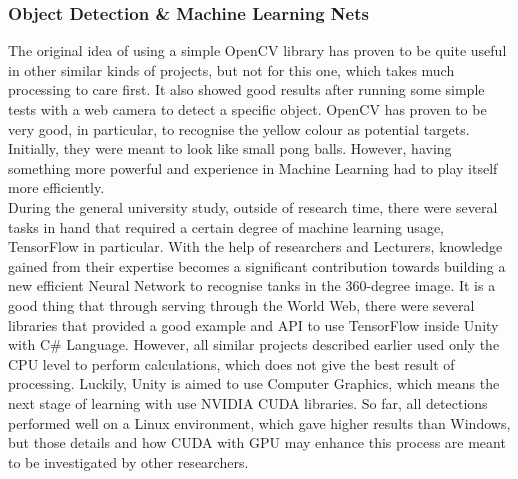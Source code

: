 \subsubsection{Object Detection \& Machine Learning Nets}
The original idea of using a simple OpenCV library has proven to be quite useful in other similar kinds of projects, but not for this one, which takes much processing to care first.
It also showed good results after running some simple tests with a web camera to detect a specific object.
OpenCV has proven to be very good, in particular, to recognise the yellow colour as potential targets.
Initially, they were meant to look like small pong balls.
However, having something more powerful and experience in Machine Learning had to play itself more efficiently. \\[1pc]
During the general university study, outside of research time, there were several tasks in hand that required a certain degree of machine learning usage, TensorFlow in particular.
With the help of researchers and Lecturers, knowledge gained from their expertise becomes a significant contribution towards building a new efficient Neural Network to recognise tanks in the 360-degree image.
It is a good thing that through serving through the World Web, there were several libraries that provided a good example and API to use TensorFlow inside Unity with C\# Language.
However, all similar projects described earlier used only the CPU level to perform calculations, which does not give the best result of processing.
Luckily, Unity is aimed to use Computer Graphics, which means the next stage of learning with use NVIDIA CUDA libraries.
So far, all detections performed well on a Linux environment, which gave higher results than Windows, but those details and how CUDA with GPU may enhance this process are meant to be investigated by other researchers.
